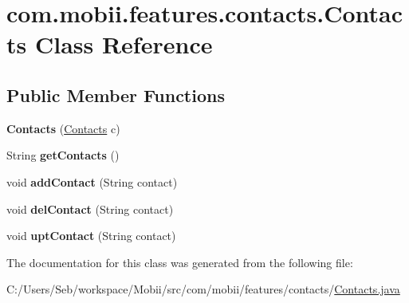 \hypertarget{classcom_1_1mobii_1_1features_1_1contacts_1_1_contacts}{\section{com.\-mobii.\-features.\-contacts.\-Contacts Class Reference}
\label{classcom_1_1mobii_1_1features_1_1contacts_1_1_contacts}
}
\subsection*{Public Member Functions}
\begin{DoxyCompactItemize}
\item 
\hypertarget{classcom_1_1mobii_1_1features_1_1contacts_1_1_contacts_a51bc154de0058e7029bce6dcf210b767}{{\bfseries Contacts} (\hyperlink{classcom_1_1mobii_1_1features_1_1contacts_1_1_contacts}{Contacts} c)}\label{classcom_1_1mobii_1_1features_1_1contacts_1_1_contacts_a51bc154de0058e7029bce6dcf210b767}

\item 
\hypertarget{classcom_1_1mobii_1_1features_1_1contacts_1_1_contacts_a87fbd02bd358564b83e8ca5df1e1d276}{String {\bfseries get\-Contacts} ()}\label{classcom_1_1mobii_1_1features_1_1contacts_1_1_contacts_a87fbd02bd358564b83e8ca5df1e1d276}

\item 
\hypertarget{classcom_1_1mobii_1_1features_1_1contacts_1_1_contacts_a9c62ea294c7bf2b9df0c96a0c2701a6c}{void {\bfseries add\-Contact} (String contact)}\label{classcom_1_1mobii_1_1features_1_1contacts_1_1_contacts_a9c62ea294c7bf2b9df0c96a0c2701a6c}

\item 
\hypertarget{classcom_1_1mobii_1_1features_1_1contacts_1_1_contacts_a4317c6a9cb3c4af8e32ad9129a842121}{void {\bfseries del\-Contact} (String contact)}\label{classcom_1_1mobii_1_1features_1_1contacts_1_1_contacts_a4317c6a9cb3c4af8e32ad9129a842121}

\item 
\hypertarget{classcom_1_1mobii_1_1features_1_1contacts_1_1_contacts_ab69025f22614eef79e36b0908398fc80}{void {\bfseries upt\-Contact} (String contact)}\label{classcom_1_1mobii_1_1features_1_1contacts_1_1_contacts_ab69025f22614eef79e36b0908398fc80}

\end{DoxyCompactItemize}


The documentation for this class was generated from the following file\-:\begin{DoxyCompactItemize}
\item 
C\-:/\-Users/\-Seb/workspace/\-Mobii/src/com/mobii/features/contacts/\hyperlink{_contacts_8java}{Contacts.\-java}\end{DoxyCompactItemize}
